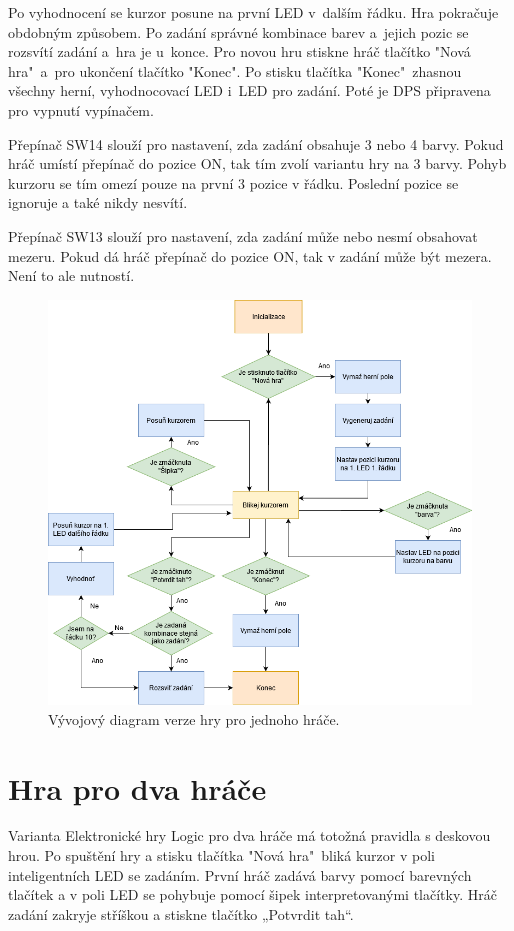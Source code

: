Po vyhodnocení se kurzor posune na první LED v~dalším řádku. Hra pokračuje obdobným způsobem.
Po zadání správné kombinace barev a~jejich pozic se rozsvítí zadání a~hra je u~konce. Pro novou hru stiskne hráč tlačítko
"Nová hra"\  a~pro ukončení tlačítko "Konec".
Po stisku tlačítka "Konec"\  zhasnou všechny herní, vyhodnocovací LED i~LED pro zadání. Poté je DPS připravena pro vypnutí
vypínačem.

Přepínač SW14 slouží pro nastavení, zda zadání obsahuje 3 nebo 4 barvy. Pokud hráč umístí přepínač do pozice ON, tak tím 
zvolí variantu hry na 3 barvy. Pohyb kurzoru se tím omezí pouze na první 3 pozice v řádku. Poslední pozice se ignoruje a také nikdy 
nesvítí.

Přepínač SW13 slouží pro nastavení, zda zadání může nebo nesmí obsahovat mezeru. Pokud dá hráč přepínač do pozice ON, 
tak v zadání může být mezera. Není to ale nutností. 

\begin{figure}[!h]
    \begin{center}
        \includegraphics[scale=0.55]{obrazky/vyvojovy_diagram_1_hrac.png}
    \end{center}
    \caption[Vývojový diagram verze hry pro jednoho hráče]{Vývojový diagram verze hry pro jednoho hráče.}
    \end{figure}

\section{Hra pro dva hráče}
Varianta Elektronické hry Logic pro dva hráče má totožná pravidla s deskovou hrou. Po spuštění hry a stisku tlačítka "Nová hra"\ bliká 
kurzor v poli inteligentních LED se zadáním. První hráč zadává barvy pomocí barevných tlačítek a v poli LED se pohybuje pomocí šipek 
interpretovanými tlačítky. Hráč zadání zakryje stříškou a stiskne tlačítko „Potvrdit tah“. 

